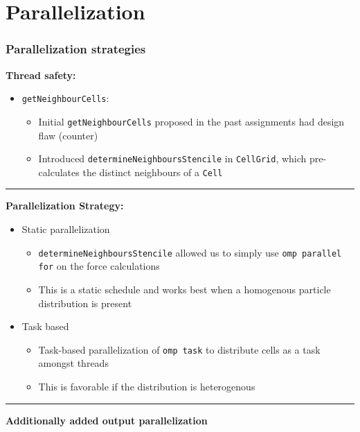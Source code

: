 \section{Parallelization}
\label{sec:parllel}

\begin{frame}
    \frametitle{Parallelization strategies}

    \textbf{Thread safety:}
    \vspace{-5pt}
    \begin{itemize}
        \item \texttt{getNeighbourCells}:
        \begin{itemize}
            \item Initial \texttt{getNeighbourCells} proposed in the past assignments had design flaw (counter)
            \item Introduced \texttt{determineNeighboursStencile} in \texttt{CellGrid}, which pre-calculates the distinct neighbours of a \texttt{Cell}
        \end{itemize}
    \end{itemize}

    \hrule

    \textbf{Parallelization Strategy:}
    \vspace{-5pt}
    \begin{itemize}
        \item Static parallelization
        \begin{itemize}
            \item \texttt{determineNeighboursStencile} allowed us to simply use  \texttt{omp parallel for} on the force calculations
            \item This is a static schedule and works best when a homogenous particle distribution is present
        \end{itemize}
        \item Task based
        \begin{itemize}
            \item Task-based parallelization of \texttt{omp task} to distribute cells as a task amongst threads
            \item This is favorable if the distribution is heterogenous
        \end{itemize}
    \end{itemize}

    \hrule

    \textbf{Additionally added output parallelization}

\end{frame}

